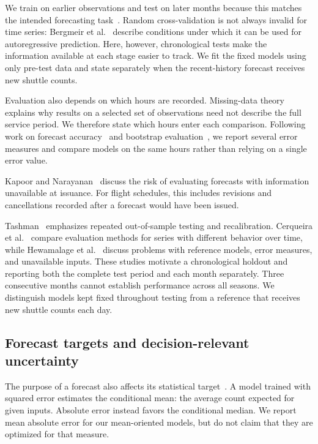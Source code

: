\documentclass[preprint,12pt,times]{elsarticle}
\begin{document}
We train on earlier observations and test on later months because this matches the intended forecasting task~\cite{fpp}. Random cross-validation is not always invalid for time series: Bergmeir et al.~\cite{bergmeir} describe conditions under which it can be used for autoregressive prediction. Here, however, chronological tests make the information available at each stage easier to track. We fit the fixed models using only pre-test data and state separately when the recent-history forecast receives new shuttle counts.

Evaluation also depends on which hours are recorded. Missing-data theory~\cite{rubin} explains why results on a selected set of observations need not describe the full service period. We therefore state which hours enter each comparison. Following work on forecast accuracy~\cite{accuracy} and bootstrap evaluation~\cite{bootstrap}, we report several error measures and compare models on the same hours rather than relying on a single error value.


Kapoor and Narayanan~\cite{leakage} discuss the risk of evaluating forecasts with information unavailable at issuance. For flight schedules, this includes revisions and cancellations recorded after a forecast would have been issued.

Tashman~\cite{tashman} emphasizes repeated out-of-sample testing and recalibration. Cerqueira et al.~\cite{cerqueira} compare evaluation methods for series with different behavior over time, while Hewamalage et al.~\cite{hewamalage} discuss problems with reference models, error measures, and unavailable inputs. These studies motivate a chronological holdout and reporting both the complete test period and each month separately. Three consecutive months cannot establish performance across all seasons. We distinguish models kept fixed throughout testing from a reference that receives new shuttle counts each day.

\subsection{Forecast targets and decision-relevant uncertainty}
The purpose of a forecast also affects its statistical target~\cite{pointforecast,koenker}. A model trained with squared error estimates the conditional mean: the average count expected for given inputs. Absolute error instead favors the conditional median. We report mean absolute error for our mean-oriented models, but do not claim that they are optimized for that measure.
\end{document}
